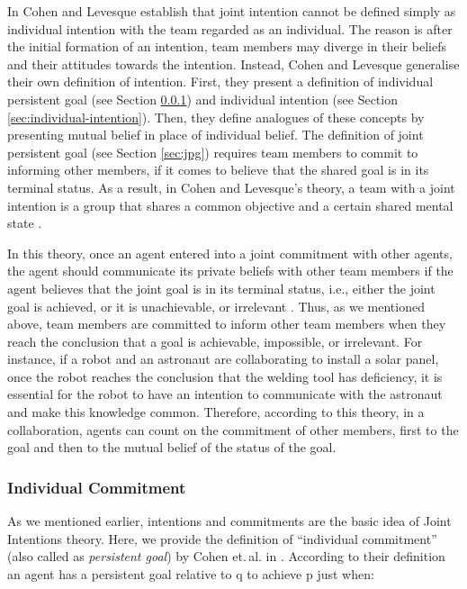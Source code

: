 \documentclass[11pt]{article}
\begin{document}
In \cite{cohen:teamwork} Cohen and Levesque establish that joint intention
cannot be defined simply as individual intention with the team regarded as an
individual. The reason is after the initial formation of an intention, team
members may diverge in their beliefs and their attitudes towards the intention.
Instead, Cohen and Levesque generalise their own definition of intention. First,
they present a definition of individual persistent goal (see Section
\ref{sec:individual-commitment}) and individual intention (see Section
\ref{sec:individual-intention}). Then, they define analogues of these concepts
by presenting mutual belief in place of individual belief. The definition of
joint persistent goal (see Section \ref{sec:jpg}) requires team members to
commit to informing other members, if it comes to believe that the shared goal
is in its terminal status. As a result, in Cohen and Levesque's theory, a team
with a joint intention is a group that shares a common objective and a certain
shared mental state \cite{jarvis:teams-multiagent-systems}.

In this theory, once an agent entered into a joint commitment with other agents,
the agent should communicate its private beliefs with other team members if the
agent believes that the joint goal is in its terminal status, i.e., either the
joint goal is achieved, or it is unachievable, or irrelevant
\cite{wilsker:study-theories}. Thus, as we mentioned above, team members are
committed to inform other team members when they reach the conclusion that a
goal is achievable, impossible, or irrelevant. For instance, if a robot and an
astronaut are collaborating to install a solar panel, once the robot reaches the
conclusion that the welding tool has deficiency, it is essential for the robot
to have an intention to communicate with the astronaut and make this knowledge
common. Therefore, according to this theory, in a collaboration, agents can
count on the commitment of other members, first to the goal and then to the
mutual belief of the status of the goal.

\subsubsection{Individual Commitment}
\label{sec:individual-commitment}

As we mentioned earlier, intentions and commitments are the basic idea of Joint
Intentions theory. Here, we provide the definition of ``individual commitment''
(also called as \textit{persistent goal}) by Cohen et.\,al. in
\cite{cohen:team-formation}. According to their definition an agent has a
persistent goal relative to q to achieve p just when:
\end{document}
